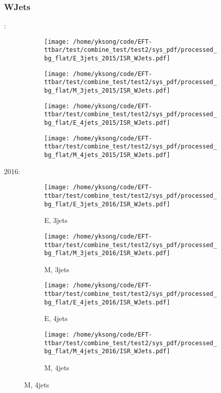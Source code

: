 \documentclass{beamer}
\begin{document}
\begin{frame}
\frametitle{WJets}
\fontsize{5}{1}:
\begin{figure}
\centering
\begin{subfigure}[b]{0.24\textwidth}
\texttt{[image: /home/yksong/code/EFT-ttbar/test/combine\_test/test2/sys\_pdf/processed\_bg\_flat/E\_3jets\_2015/ISR\_WJets.pdf]}
\end{subfigure}
\begin{subfigure}[b]{0.24\textwidth}
\texttt{[image: /home/yksong/code/EFT-ttbar/test/combine\_test/test2/sys\_pdf/processed\_bg\_flat/M\_3jets\_2015/ISR\_WJets.pdf]}
\end{subfigure}
\begin{subfigure}[b]{0.24\textwidth}
\texttt{[image: /home/yksong/code/EFT-ttbar/test/combine\_test/test2/sys\_pdf/processed\_bg\_flat/E\_4jets\_2015/ISR\_WJets.pdf]}
\end{subfigure}
\begin{subfigure}[b]{0.24\textwidth}
\texttt{[image: /home/yksong/code/EFT-ttbar/test/combine\_test/test2/sys\_pdf/processed\_bg\_flat/M\_4jets\_2015/ISR\_WJets.pdf]}
\end{subfigure}
\end{figure}
2016:
\begin{figure}
\centering
\begin{subfigure}[b]{0.24\textwidth}
\texttt{[image: /home/yksong/code/EFT-ttbar/test/combine\_test/test2/sys\_pdf/processed\_bg\_flat/E\_3jets\_2016/ISR\_WJets.pdf]}
\captionsetup{font=tiny}
\caption{E, 3jets}
\end{subfigure}
\begin{subfigure}[b]{0.24\textwidth}
\texttt{[image: /home/yksong/code/EFT-ttbar/test/combine\_test/test2/sys\_pdf/processed\_bg\_flat/M\_3jets\_2016/ISR\_WJets.pdf]}
\captionsetup{font=tiny}
\caption{M, 3jets}
\end{subfigure}
\begin{subfigure}[b]{0.24\textwidth}
\texttt{[image: /home/yksong/code/EFT-ttbar/test/combine\_test/test2/sys\_pdf/processed\_bg\_flat/E\_4jets\_2016/ISR\_WJets.pdf]}
\captionsetup{font=tiny}
\caption{E, 4jets}
\end{subfigure}
\begin{subfigure}[b]{0.24\textwidth}
\texttt{[image: /home/yksong/code/EFT-ttbar/test/combine\_test/test2/sys\_pdf/processed\_bg\_flat/M\_4jets\_2016/ISR\_WJets.pdf]}
\captionsetup{font=tiny}
\caption{M, 4jets}
\end{subfigure}
\end{figure}
\end{frame}
\end{document}
